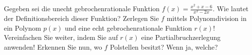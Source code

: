 \item Gegeben sei die unecht gebrochenrationale Funktion $f(x) = \frac{x^2+x-6}{x^2-2x}$. Wie lautet der Definitionsbereich dieser Funktion? Zerlegen Sie $f$ mittels Polynomdivision in ein Polynom $p(x)$ und eine echt gebrochenrationale Funktion $r(x)$! Vereinfachen Sie weiter, indem Sie auf $r(x)$ eine Partialbruchzerlegung anwenden! Erkennen Sie nun, wo $f$ Polstellen besitzt? Wenn ja, welche? 
